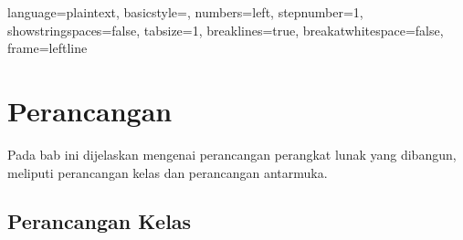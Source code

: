 
\lstset
{ 
    language=plaintext,
    basicstyle=\footnotesize,
    numbers=left,
    stepnumber=1,
    showstringspaces=false,
    tabsize=1,
    breaklines=true,
    breakatwhitespace=false,
    frame=leftline
}



\chapter{Perancangan}
\label{chap:Perancangan}

Pada bab ini dijelaskan mengenai perancangan perangkat lunak yang dibangun, meliputi perancangan kelas dan perancangan antarmuka.
\section{Perancangan Kelas}
\label{sec:perancangan_kelas}

